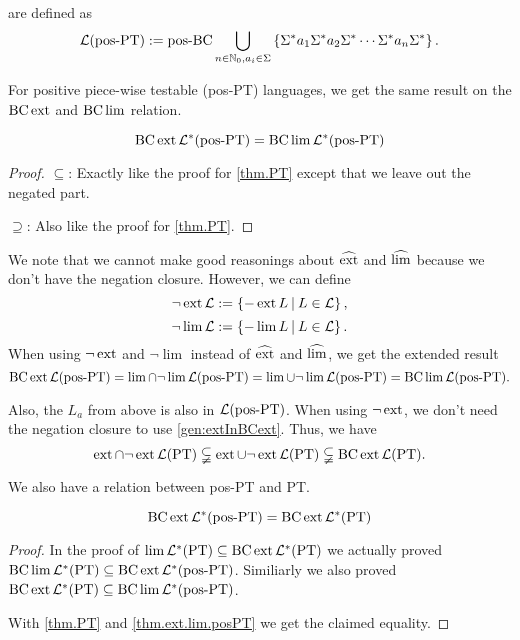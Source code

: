 \

\label{lang:posPT}
 are defined as
\[ \Lang(\mathtext{pos-PT}) := \operatorname{pos-BC} \bigcup_{n\in\N_0,a_i \in \Sigma} \Set{\Sigma^* a_1 \Sigma^* a_2 \Sigma^* \cdots\Sigma^* a_n \Sigma^*} . \]

For positive piece-wise testable (pos-PT) languages, we get the same result on the $\operatorname{BC} \operatorname{ext}$ and $\operatorname{BC} \lim$ relation.

\begin{theorem}
\label{thm.ext.lim.posPT}
\[ \operatorname{BC} \operatorname{ext} \mathcal{L}^* (\textup{\textrm{pos-PT}}) = \operatorname{BC} \lim \mathcal{L}^* (\textup{\textrm{pos-PT}}) \]
\begin{proof}
$\subseteq$: Exactly like the proof for \cref{thm.PT} except that we leave out the negated part.

$\supseteq$: Also like the proof for \cref{thm.PT}.
\end{proof}
\end{theorem}

We note that we cannot make good reasonings about $\operatorname{\widehat{ext}}$ and $\operatorname{\widehat{lim}}$ because we don't have the negation closure. However, we can define
\[ \neg\ext \Lang := \Set{-\ext L}{L \in \Lang} , \]
\[ \neg\lim \Lang := \Set{-\lim L}{L \in \Lang} . \]
When using $\neg\operatorname{ext}$ and $\neg\lim$ instead of $\operatorname{\widehat{ext}}$ and $\operatorname{\widehat{lim}}$, we get the extended result
\[ \operatorname{BC} \operatorname{ext} \mathcal{L}(\textup{\textrm{pos-PT}}) =
\lim \cap \neg\lim \mathcal{L}(\textup{\textrm{pos-PT}}) =
\lim \cup \neg\lim \mathcal{L}(\textup{\textrm{pos-PT}}) =
\operatorname{BC} \lim \mathcal{L}(\textup{\textrm{pos-PT}}) .\]

Also, the $L_a$ from above is also in $\mathcal{L}(\textup{\textrm{pos-PT}})$. When using $\neg\operatorname{ext}$, we don't need the negation closure to use \cref{gen:extInBCext}. Thus, we have
\[ \operatorname{ext} \cap \neg\operatorname{ext} \mathcal{L}(\textup{\textrm{PT}}) \subsetneqq
\operatorname{ext} \cup \neg\operatorname{ext} \mathcal{L}(\textup{\textrm{PT}}) \subsetneqq
\operatorname{BC} \operatorname{ext} \mathcal{L}(\textup{\textrm{PT}}) . \]

We also have a relation between pos-PT and PT.

\begin{lemma}
\[ \operatorname{BC} \operatorname{ext} \mathcal{L}^*(\textup{\textrm{pos-PT}}) = \operatorname{BC} \operatorname{ext} \mathcal{L}^* (\textup{\textrm{PT}}) \]

\begin{proof}
In the proof of $\lim \mathcal{L}^*(\textup{\textrm{PT}}) \subseteq \operatorname{BC} \operatorname{ext} \mathcal{L}^* (\textup{\textrm{PT}})$ we actually proved $\operatorname{BC} \lim \mathcal{L}^*(\textup{\textrm{PT}}) \subseteq \operatorname{BC} \operatorname{ext} \mathcal{L}^* (\textup{\textrm{pos-PT}})$. Similiarly we also proved $\operatorname{BC} \operatorname{ext} \mathcal{L}^* (\textup{\textrm{PT}}) \subseteq \operatorname{BC} \lim \mathcal{L}^* (\textup{\textrm{pos-PT}})$.

With \cref{thm.PT} and \cref{thm.ext.lim.posPT} we get the claimed equality.
\end{proof}
\end{lemma}

